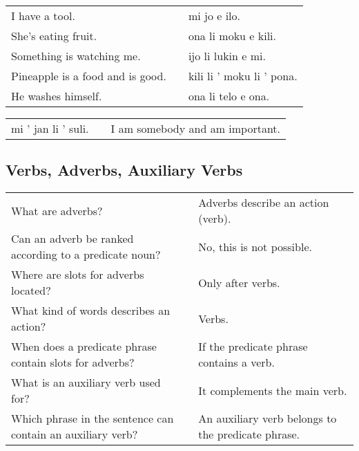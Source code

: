 \begin{supertabular}{p{5,5cm}|ll}
    I have a tool.                   &  & mi jo e ilo.              \\ %
    She's eating fruit.              &  & ona li moku e kili.       \\ %
    Something is watching me.        &  & ijo li lukin e mi.        \\ %
    Pineapple is a food and is good. &  & kili li ' moku li ' pona. \\ %
    He washes himself.               &  & ona li telo e ona.        \\ %
\end{supertabular}

\begin{supertabular}{p{5,5cm}|ll}
    mi ' jan li ' suli. &  & I am somebody and am important. \\
\end{supertabular}

\newpage
%
\subsection*{Verbs, Adverbs, Auxiliary Verbs}
\label{'adverbs'}
%
\begin{supertabular}{p{5,5cm}|ll}
    What are adverbs?                                           &  & Adverbs describe an action (verb).                 \\ %
    Can an adverb be ranked according to a predicate noun?      &  & No, this is not possible.                          \\ %
    Where are slots for adverbs located?                        &  & Only after verbs.                                  \\ %
    What kind of words describes an action?                     &  & Verbs.                                             \\ %
    When does a predicate phrase contain slots for adverbs?     &  & If the predicate phrase contains a verb.           \\ %
    What is an auxiliary verb used for?                         &  & It complements the main verb.                      \\ %
    Which phrase in the sentence can contain an auxiliary verb? &  & An auxiliary verb belongs to the predicate phrase. \\ %
\end{supertabular}

